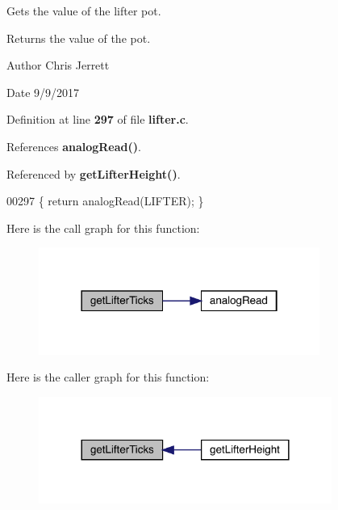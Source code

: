 Gets the value of the lifter pot. 

\begin{DoxyReturn}{Returns}
the value of the pot. 
\end{DoxyReturn}
\begin{DoxyAuthor}{Author}
Chris Jerrett 
\end{DoxyAuthor}
\begin{DoxyDate}{Date}
9/9/2017 
\end{DoxyDate}


Definition at line \textbf{ 297} of file \textbf{ lifter.\+c}.



References \textbf{ analog\+Read()}.



Referenced by \textbf{ get\+Lifter\+Height()}.


\begin{DoxyCode}
00297 \{ \textcolor{keywordflow}{return} analogRead(LIFTER); \}
\end{DoxyCode}
Here is the call graph for this function\+:
\nopagebreak
\begin{figure}[H]
\begin{center}
\leavevmode
\includegraphics[width=261pt]{lifter_8c_acdf909159b0406c48099843f2306be78_cgraph}
\end{center}
\end{figure}
Here is the caller graph for this function\+:
\nopagebreak
\begin{figure}[H]
\begin{center}
\leavevmode
\includegraphics[width=272pt]{lifter_8c_acdf909159b0406c48099843f2306be78_icgraph}
\end{center}
\end{figure}
\mbox{\label{lifter_8c_a3738d33dc870f98243a93bddd855b43e}} 
